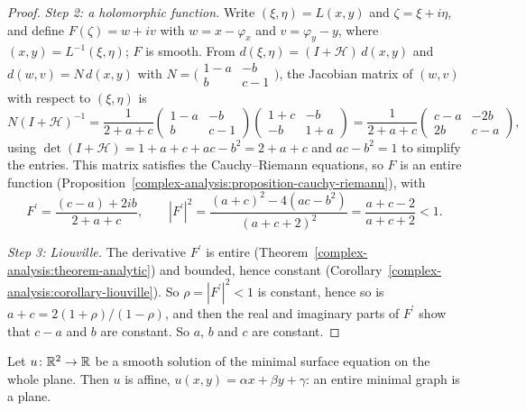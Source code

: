 \begin{proof}
\emph{Step 2: a holomorphic function.} Write $(\xi, \eta) = L(x, y)$ and $\zeta = \xi + i\eta$, and define $F(\zeta) = w + iv$ with $w = x - \varphi_x$ and $v = \varphi_y - y$,
where $(x, y) = L^{-1}(\xi, \eta)$; $F$ is smooth. From $d(\xi, \eta) = (I + \mathcal{H})\,d(x, y)$ and $d(w, v) = N\,d(x, y)$ with
$N = \bigl(\begin{smallmatrix} 1 - a & -b\\ b & c - 1\end{smallmatrix}\bigr)$, the Jacobian matrix of $(w, v)$ with respect to $(\xi, \eta)$ is
\[
N(I + \mathcal{H})^{-1} = \frac1{2 + a + c}\begin{pmatrix} 1 - a & -b\\ b & c - 1\end{pmatrix}\begin{pmatrix} 1 + c & -b\\ -b & 1 + a\end{pmatrix}
= \frac1{2 + a + c}\begin{pmatrix} c - a & -2b\\ 2b & c - a\end{pmatrix},
\]
using $\det(I + \mathcal{H}) = 1 + a + c + ac - b^2 = 2 + a + c$ and $ac - b^2 = 1$ to simplify the entries. This matrix satisfies the Cauchy--Riemann equations, so $F$ is an
entire function (Proposition~\ref{complex-analysis:proposition-cauchy-riemann}), with
\[
F^{\prime} = \frac{(c - a) + 2ib}{2 + a + c}, \qquad |F^{\prime}|^2 = \frac{(a + c)^2 - 4(ac - b^2)}{(a + c + 2)^2} = \frac{a + c - 2}{a + c + 2} < 1 .
\]

\emph{Step 3: Liouville.} The derivative $F^{\prime}$ is entire (Theorem~\ref{complex-analysis:theorem-analytic}) and bounded, hence constant
(Corollary~\ref{complex-analysis:corollary-liouville}). So $\rho = |F^{\prime}|^2 < 1$ is constant, hence so is $a + c = 2(1 + \rho)/(1 - \rho)$, and then the real and imaginary parts
of $F^{\prime}$ show that $c - a$ and $b$ are constant. So $a$, $b$ and $c$ are constant.
\end{proof}

\begin{theorem}[Bernstein]\label{riemannian-geometry:theorem-bernstein}
Let $u \colon \mathbb{R}^2 \to \mathbb{R}$ be a smooth solution of the minimal surface equation on the whole plane. Then $u$ is affine, $u(x, y) = \alpha x + \beta y + \gamma$: an entire
minimal graph is a plane.
\end{theorem}

